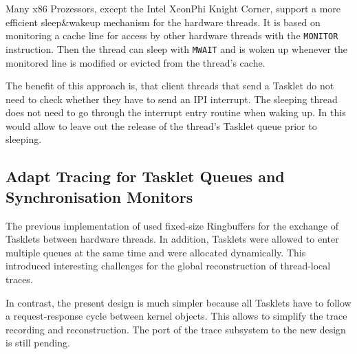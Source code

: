 Many x86 Prozessors, except the Intel XeonPhi Knight Corner, support a more efficient sleep\&wakeup mechanism for the hardware threads. It is based on monitoring a cache line for access by other hardware threads with the \texttt{MONITOR} instruction. Then the thread can sleep with \texttt{MWAIT} and is woken up whenever the monitored line is modified or evicted from the thread's cache. 

The benefit of this approach is, that client threads that send a Tasklet do not need to check whether they have to send an IPI interrupt. The sleeping thread does not need to go through the interrupt entry routine when waking up. In \mythos this would allow to leave out the release of the thread's Tasklet queue prior to sleeping.

\subsection{Adapt Tracing for Tasklet Queues and Synchronisation Monitors}
The previous implementation of \mythos used fixed-size Ringbuffers for the exchange of Tasklets between hardware threads. In addition, Tasklets were allowed to enter multiple queues at the same time and were allocated dynamically. This introduced interesting challenges for the global reconstruction of thread-local traces. 

In contrast, the present design is much simpler because all Tasklets have to follow a request-response cycle between kernel objects. This allows to simplify the trace recording and reconstruction. The port of the trace subsystem to the new design is still pending.






